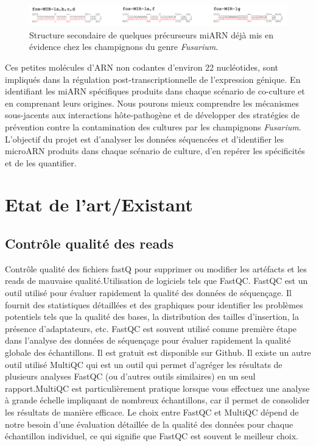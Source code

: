 \documentclass{report}
\begin{document}
\begin{figure}[h]
    \centering
    \includegraphics[width=1\textwidth]{Images/fig_3.png}
    \caption{Structure secondaire de quelques précurseurs miARN déjà mis en évidence chez les champignons du genre \textit{Fusarium}.\cite{chen2014exploring}}
    \label{fig:mirna}
\end{figure}

Ces petites molécules d'ARN non codantes d'environ 22 nucléotides, sont impliqués dans la régulation post-transcriptionnelle de l'expression génique. En identifiant les miARN spécifiques produits dans chaque scénario de co-culture et en comprenant leurs origines. Nous pourons mieux comprendre les mécanismes sous-jacents aux interactions hôte-pathogène et de développer des stratégies de prévention contre la contamination des cultures par les champignons \textit{Fusarium}. \cite{ponts2009fusarium, mycsa} \\

L’objectif du projet est d’analyser les données séquencées et d’identifier les microARN produits dans chaque scénario de culture, d’en repérer les spécificités et de les quantifier.

\section{Etat de l'art/Existant}
\subsection{Contrôle qualité des reads}
Contrôle qualité des fichiers fastQ pour supprimer ou modifier les artéfacts et les reads de mauvaise qualité.Utilisation de logiciels tels que FastQC. FastQC est un outil utilisé pour évaluer rapidement la qualité des données de séquençage. Il fournit des statistiques détaillées et des graphiques pour identifier les problèmes potentiels tels que la qualité des bases, la distribution des tailles d'insertion, la présence d'adaptateurs, etc.
FastQC est souvent utilisé comme première étape dans l'analyse des données de séquençage pour évaluer rapidement la qualité globale des échantillons. Il est gratuit est disponible
sur Github.\cite{fastqc}
Il existe un autre outil utilisé MultiQC \cite{multiqc} qui est un outil qui permet d'agréger les résultats de plusieurs analyses FastQC (ou d'autres outils similaires) en un seul rapport.MultiQC est particulièrement pratique lorsque vous effectuez une analyse à grande échelle impliquant de nombreux échantillons, car il permet de consolider les résultats de manière efficace.
Le choix entre FastQC et MultiQC dépend de notre besoin d'une évaluation détaillée de la qualité des données pour chaque échantillon individuel, ce qui signifie que FastQC est souvent le meilleur choix.
\end{document}
